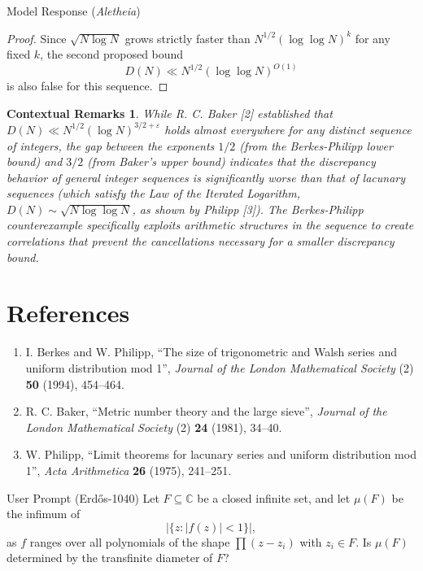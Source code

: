 \documentclass[11pt]{article}
\newtheorem*{remark}{Contextual Remarks}
\begin{document}
\begin{solution}{Model Response (\emph{Aletheia})}
\begin{proof}
Since $\sqrt{N \log N}$ grows strictly faster than $N^{1/2}(\log \log N)^{k}$ for any fixed $k$, the second proposed bound
\[ D(N) \ll N^{1/2}(\log\log N)^{O(1)} \]
is also false for this sequence.
\end{proof}

\begin{remark}
While R. C. Baker [2] established that $D(N) \ll N^{1/2}(\log N)^{3/2+\varepsilon}$ holds almost everywhere for \textit{any} distinct sequence of integers, the gap between the exponents $1/2$ (from the Berkes-Philipp lower bound) and $3/2$ (from Baker's upper bound) indicates that the discrepancy behavior of general integer sequences is significantly worse than that of lacunary sequences (which satisfy the Law of the Iterated Logarithm, $D(N) \sim \sqrt{N \log \log N}$, as shown by Philipp [3]). The Berkes-Philipp counterexample specifically exploits arithmetic structures in the sequence to create correlations that prevent the cancellations necessary for a smaller discrepancy bound.
\end{remark}

\section*{References}

\begin{enumerate}
    \item[{[1]}] I. Berkes and W. Philipp, ``The size of trigonometric and Walsh series and uniform distribution mod 1'', \textit{Journal of the London Mathematical Society} (2) \textbf{50} (1994), 454–464.
    \item[{[2]}] R. C. Baker, ``Metric number theory and the large sieve'', \textit{Journal of the London Mathematical Society} (2) \textbf{24} (1981), 34–40.
    \item[{[3]}] W. Philipp, ``Limit theorems for lacunary series and uniform distribution mod 1'', \textit{Acta Arithmetica} \textbf{26} (1975), 241–251.
\end{enumerate}
\end{solution}


\begin{problem}{User Prompt (Erd\H{o}s-1040)}
    Let $F\subseteq \mathbb{C}$ be a closed infinite set, and let $\mu(F)$ be the infimum of\[\lvert \{ z: \lvert f(z)\rvert < 1\}\rvert,\]as $f$ ranges over all polynomials of the shape $\prod (z-z_i)$ with $z_i\in F$. Is $\mu(F)$ determined by the transfinite diameter of $F$?
\end{problem}
\end{document}
